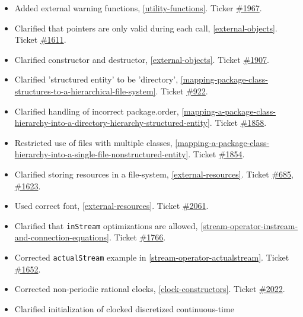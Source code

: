 \begin{itemize}
\item
  Added external warning functions, \cref{utility-functions}. Ticker
  \href{https://github.com/modelica/ModelicaSpecification/issues/1967}{\#1967}.
\item
  Clarified that pointers are only valid during each call, \cref{external-objects}. Ticket
  \href{https://github.com/modelica/ModelicaSpecification/issues/1611}{\#1611}.
\item
  Clarified constructor and destructor, \cref{external-objects}. Ticket
  \href{https://github.com/modelica/ModelicaSpecification/issues/1907}{\#1907}.
\item
  Clarified 'structured entity' to be 'directory', \cref{mapping-package-class-structures-to-a-hierarchical-file-system}.
  Ticket \href{https://github.com/modelica/ModelicaSpecification/issues/922}{\#922}.
\item
  Clarified handling of incorrect package.order, \cref{mapping-a-package-class-hierarchy-into-a-directory-hierarchy-structured-entity}.
  Ticket \href{https://github.com/modelica/ModelicaSpecification/issues/1858}{\#1858}.
\item
  Restricted use of files with multiple classes, \cref{mapping-a-package-class-hierarchy-into-a-single-file-nonstructured-entity}.
  Ticket \href{https://github.com/modelica/ModelicaSpecification/issues/1854}{\#1854}.
\item
  Clarified storing resources in a file-system, \cref{external-resources}. Ticket
  \href{https://github.com/modelica/ModelicaSpecification/issues/685}{\#685},
  \href{https://github.com/modelica/ModelicaSpecification/issues/1623}{\#1623}.
\item
  Used correct font, \cref{external-resources}. Ticket
  \href{https://github.com/modelica/ModelicaSpecification/issues/2061}{\#2061}.
\item
  Clarified that \lstinline!inStream! optimizations are allowed, \cref{stream-operator-instream-and-connection-equations}.
  Ticket \href{https://github.com/modelica/ModelicaSpecification/issues/1766}{\#1766}.
\item
  Corrected \lstinline!actualStream! example in \cref{stream-operator-actualstream}. Ticket
  \href{https://github.com/modelica/ModelicaSpecification/issues/1652}{\#1652}.
\item
  Corrected non-periodic rational clocks, \cref{clock-constructors}. Ticket
  \href{https://github.com/modelica/ModelicaSpecification/issues/2022}{\#2022}.
\item
  Clarified initialization of clocked discretized continuous-time

\end{itemize}
